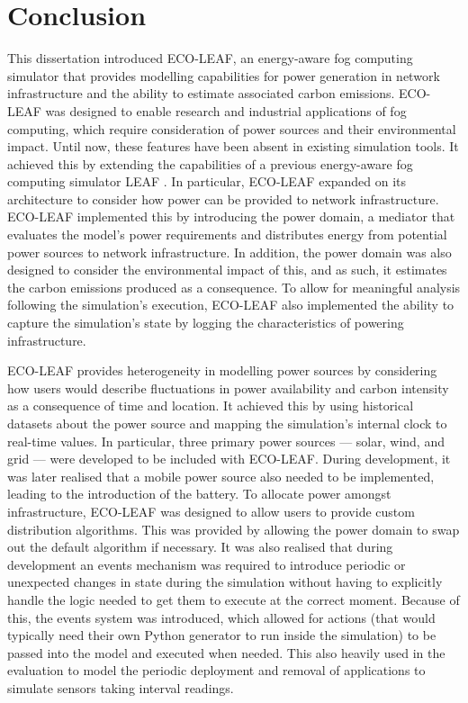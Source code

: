 \documentclass{l4proj}
\begin{document}
\chapter{Conclusion}
This dissertation introduced ECO-LEAF, an energy-aware fog computing simulator that provides modelling capabilities for power generation in network infrastructure and the ability to estimate associated carbon emissions.
ECO-LEAF was designed to enable research and industrial applications of fog computing, which require consideration of power sources and their environmental impact.
Until now, these features have been absent in existing simulation tools.
It achieved this by extending the capabilities of a previous energy-aware fog computing simulator  LEAF \citep{leaf2021}.
In particular, ECO-LEAF expanded on its architecture to consider how power can be provided to network infrastructure.
ECO-LEAF implemented this by introducing the power domain, a mediator that evaluates the model's power requirements and distributes energy from potential power sources to network infrastructure.
In addition, the power domain was also designed to consider the environmental impact of this, and as such, it estimates the carbon emissions produced as a consequence.
To allow for meaningful analysis following the simulation's execution, ECO-LEAF also implemented the ability to capture the simulation's state by logging the characteristics of powering infrastructure.

ECO-LEAF provides heterogeneity in modelling power sources by considering how users would describe fluctuations in power availability and carbon intensity as a consequence of time and location.
It achieved this by using historical datasets about the power source and mapping the simulation's internal clock to real-time values.
In particular, three primary power sources — solar, wind, and grid — were developed to be included with ECO-LEAF.
During development, it was later realised that a mobile power source also needed to be implemented, leading to the introduction of the battery.
To allocate power amongst infrastructure, ECO-LEAF was designed to allow users to provide custom distribution algorithms.
This was provided by allowing the power domain to swap out the default algorithm if necessary.
It was also realised that during development an events mechanism was required to introduce periodic or unexpected changes in state during the simulation without having to explicitly handle the logic needed to get them to execute at the correct moment.
Because of this, the events system was introduced, which allowed for actions (that would typically need their own Python generator to run inside the simulation) to be passed into the model and executed when needed.
This also heavily used in the evaluation to model the periodic deployment and removal of applications to simulate sensors taking interval readings.
\end{document}
